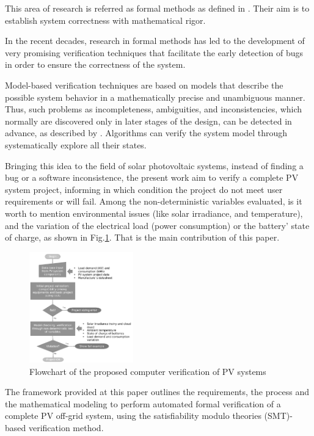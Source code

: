 \documentclass[journal]{IEEEtran}
\begin{document}
This area of research is referred as formal methods as defined in \cite{Clarkeetal}. Their aim is to establish system correctness with mathematical rigor. 

In the recent decades, research in formal methods has led to the development of very promising verification techniques that facilitate the early detection of bugs in order to ensure the correctness of the system. 

Model-based verification techniques are based on models that describe the possible system behavior in a mathematically precise and unambiguous manner. Thus, such problems as incompleteness, ambiguities, and inconsistencies, which normally are discovered only in later stages of the design, can be detected in advance, as described by \cite{Trindade}. Algorithms can verify the system model through systematically explore all their states. 

Bringing this idea to the field of solar photovoltaic systems, instead of finding a bug or a software inconsistence, the present work aim to verify a complete PV system project, informing in which condition the project do not meet user requirements or will fail. Among the non-deterministic variables evaluated, is it worth to mention environmental issues (like solar irradiance, and temperature), and the variation of the electrical load (power consumption) or the battery' state of charge, as shown in Fig.\ref{fig:flowchartgeneral}. That is the main contribution of this paper.

\begin{figure}[h]
\includegraphics[width=0.4\textwidth]{flowchart_verification.png}
\centering
\caption{Flowchart of the proposed computer verification of PV systems}
\label{fig:flowchartgeneral}
\end{figure}

The framework provided at this paper outlines the requirements, the process and the mathematical modeling to perform automated formal verification of a complete PV off-grid system, using the satisfiability modulo theories (SMT)-based verification method.
 
\end{document}
